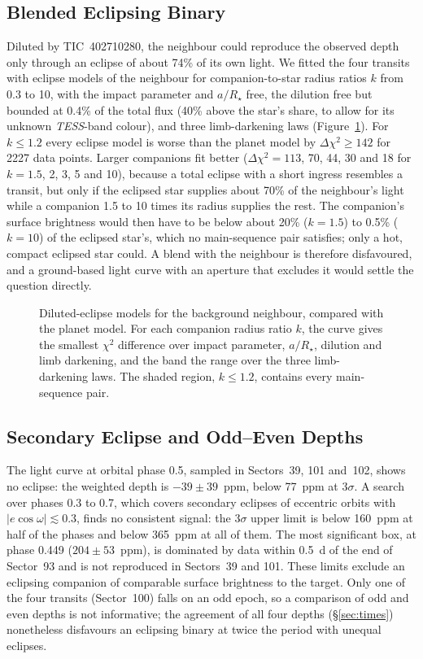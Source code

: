 \documentclass[twocolumn]{aastex631}
\newcommand{\tic}{TIC~402710280}
\newcommand{\tess}{\textit{TESS}}
\begin{document}
\subsection{Blended Eclipsing Binary} \label{sec:blend}

Diluted by \tic, the neighbour could reproduce the observed depth only through an eclipse of about 74\% of its own light. We fitted the four transits with eclipse models of the neighbour for companion-to-star radius ratios $k$ from 0.3 to 10, with the impact parameter and $a/R_\star$ free, the dilution free but bounded at 0.4\% of the total flux (40\% above the star's share, to allow for its unknown \tess-band colour), and three limb-darkening laws (Figure~\ref{fig:blend}). For $k \leq 1.2$ every eclipse model is worse than the planet model by $\Delta\chi^2 \geq 142$ for 2227 data points. Larger companions fit better ($\Delta\chi^2 = 113$, 70, 44, 30 and 18 for $k = 1.5$, 2, 3, 5 and 10), because a total eclipse with a short ingress resembles a transit, but only if the eclipsed star supplies about 70\% of the neighbour's light while a companion 1.5 to 10 times its radius supplies the rest. The companion's surface brightness would then have to be below about 20\% ($k = 1.5$) to 0.5\% ($k = 10$) of the eclipsed star's, which no main-sequence pair satisfies; only a hot, compact eclipsed star could. A blend with the neighbour is therefore disfavoured, and a ground-based light curve with an aperture that excludes it would settle the question directly.

\begin{figure}
\caption{Diluted-eclipse models for the background neighbour, compared with the planet model. For each companion radius ratio $k$, the curve gives the smallest $\chi^2$ difference over impact parameter, $a/R_\star$, dilution and limb darkening, and the band the range over the three limb-darkening laws. The shaded region, $k \leq 1.2$, contains every main-sequence pair.\label{fig:blend}}
\end{figure}

\subsection{Secondary Eclipse and Odd--Even Depths} \label{sec:secondary}

The light curve at orbital phase 0.5, sampled in Sectors~39, 101 and~102, shows no eclipse: the weighted depth is $-39 \pm 39$~ppm, below 77~ppm at $3\sigma$. A search over phases 0.3 to 0.7, which covers secondary eclipses of eccentric orbits with $|e\cos\omega| \lesssim 0.3$, finds no consistent signal: the 3$\sigma$ upper limit is below 160~ppm at half of the phases and below 365~ppm at all of them. The most significant box, at phase 0.449 ($204 \pm 53$~ppm), is dominated by data within 0.5~d of the end of Sector~93 and is not reproduced in Sectors~39 and 101. These limits exclude an eclipsing companion of comparable surface brightness to the target. Only one of the four transits (Sector~100) falls on an odd epoch, so a comparison of odd and even depths is not informative; the agreement of all four depths (\S\ref{sec:times}) nonetheless disfavours an eclipsing binary at twice the period with unequal eclipses.
\end{document}
